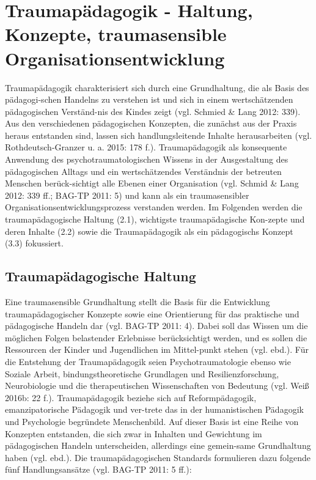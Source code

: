\section{Traumap{\"a}dagogik - Haltung, Konzepte, traumasensible Organisationsentwicklung}

Traumapädagogik charakterisiert sich durch eine Grundhaltung, die als Basis des pädagogi-schen Handelns zu verstehen ist und sich in einem wertschätzenden pädagogischen Verständ-nis des Kindes zeigt (vgl. Schmied \& Lang 2012: 339). Aus den verschiedenen pädagogischen Konzepten, die zunächst aus der Praxis heraus entstanden sind, lassen sich handlungsleitende Inhalte herausarbeiten (vgl. Rothdeutsch-Granzer u. a. 2015: 178 f.). Traumapädagogik als konsequente Anwendung des psychotraumatologischen Wissens in der Ausgestaltung des pädagogischen Alltags und ein wertschätzendes Verständnis der betreuten Menschen berück-sichtigt alle Ebenen einer Organisation (vgl. Schmid \& Lang 2012: 339 ff.; BAG-TP 2011: 5) und kann als ein traumasensibler Organisationsentwicklungsprozess verstanden werden. Im Folgenden werden die traumapädagogische Haltung (2.1), wichtigste traumapädagische Kon-zepte und deren Inhalte (2.2) sowie die Traumap{\"a}dagogik als ein pädagogischs Konzept (3.3) fokussiert.

\subsection{Traumapädagogische Haltung}

Eine traumasensible Grundhaltung stellt die Basis für die Entwicklung traumapädagogischer Konzepte sowie eine Orientierung für das praktische und pädagogische Handeln dar (vgl. BAG-TP 2011: 4). Dabei soll das Wissen um die möglichen Folgen belastender Erlebnisse berücksichtigt werden, und es sollen die Ressourcen der Kinder und Jugendlichen im Mittel-punkt stehen (vgl. ebd.). Für die Entstehung der Traumap{\"a}dagogik seien Psychotraumatologie ebenso wie Soziale Arbeit, bindungstheoretische Grundlagen und Resilienzforschung, Neurobiologie und die therapeutischen Wissenschaften von Bedeutung (vgl. Weiß 2016b: 22 f.). Traumap{\"a}dagogik beziehe sich auf Reformpädagogik, emanzipatorische Pädagogik und ver-trete das in der humanistischen Pädagogik und Psychologie begründete Menschenbild. Auf dieser Basis ist eine Reihe von Konzepten entstanden, die sich zwar in Inhalten und Gewichtung im pädagogischen Handeln unterscheiden, allerdings eine gemein-same Grundhaltung haben (vgl. ebd.). Die traumapädagogischen Standards formulieren dazu folgende fünf Handlungsansätze (vgl. BAG-TP 2011: 5 ff.):

